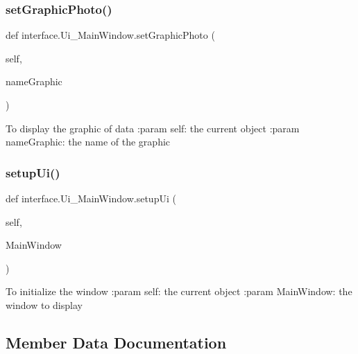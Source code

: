 \subsubsection{\texorpdfstring{set\+Graphic\+Photo()}{setGraphicPhoto()}}
{\footnotesize\ttfamily def interface.\+Ui\+\_\+\+Main\+Window.\+set\+Graphic\+Photo (\begin{DoxyParamCaption}\item[{}]{self,  }\item[{}]{name\+Graphic }\end{DoxyParamCaption})}

\begin{DoxyVerb}To display the graphic of data
:param self: the current object
:param nameGraphic: the name of the graphic
\end{DoxyVerb}
 \mbox{\label{classinterface_1_1_ui___main_window_a8aee73c26067cbf824ccc04cadc38965}} 
\subsubsection{\texorpdfstring{setup\+Ui()}{setupUi()}}
{\footnotesize\ttfamily def interface.\+Ui\+\_\+\+Main\+Window.\+setup\+Ui (\begin{DoxyParamCaption}\item[{}]{self,  }\item[{}]{Main\+Window }\end{DoxyParamCaption})}

\begin{DoxyVerb}To initialize the window
:param self: the current object
:param MainWindow: the window to display 
\end{DoxyVerb}
 

\subsection{Member Data Documentation}
\mbox{\label{classinterface_1_1_ui___main_window_a8cc0e437b4d74bcf12ec2b60af3b5b00}} 
